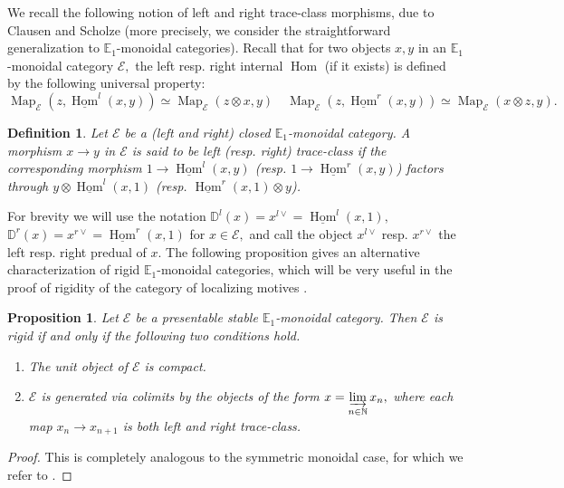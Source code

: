 \documentclass[11pt,leqno]{amsart}
\newtheorem{defi}[theo]{Definition}
\newtheorem{prop}[theo]{Proposition}
\numberwithin{equation}{section}
\def\N{\mathbb{N}}
\def\Hom{\operatorname{Hom}}
\def\Map{\operatorname{Map}}
\newcommand{\indlim}[1][]{\mathop{\varinjlim}\limits_{#1}}
\newcommand{\bbD}{{\mathbb D}}
\newcommand{\bE}{{\mathbb E}}
\newcommand{\cE}{{\mathcal E}}
\newcommand{\un}{\underline}
\begin{document}
We recall the following notion of left and right trace-class morphisms, due to Clausen and Scholze \cite[Definition 13.11]{CS20} (more precisely, we consider the straightforward generalization to $\bE_1$-monoidal categories). Recall that for two objects $x,y$ in an $\bE_1$-monoidal category $\cE,$ the left resp. right internal $\Hom$ (if it exists) is defined by the following universal property:
\begin{equation*}
\Map_{\cE}(z,\un{\Hom}^l(x,y))\simeq \Map_{\cE}(z\otimes x,y)\quad \Map_{\cE}(z,\un{\Hom}^r(x,y))\simeq \Map_{\cE}(x\otimes z,y).
\end{equation*}

\begin{defi}\label{def:trace_class} Let $\cE$ be a (left and right) closed $\bE_1$-monoidal category. A morphism $x\to y$ in $\cE$ is said to be left (resp. right) trace-class if the corresponding morphism $1\to\un{\Hom}^l(x,y)$ (resp. $1\to\un{\Hom}^r(x,y)$) factors through $y\otimes \un{\Hom}^l(x,1)$ (resp. $\un{\Hom}^r(x,1)\otimes y$).
\end{defi}

For brevity we will use the notation $\bbD^l(x)=x^{l\vee}=\un{\Hom}^l(x,1),$ $\bbD^r(x)=x^{r\vee}=\un{\Hom}^r(x,1)$ for $x\in\cE,$ and call the object $x^{l\vee}$ resp. $x^{r\vee}$ the left resp. right predual of $x.$ The following proposition gives an alternative characterization of rigid $\bE_1$-monoidal categories, which will be very useful in the proof of rigidity of the category of localizing motives \cite{E}.

\begin{prop}\label{prop:rigidity_criterion}\cite{Ram24b}
Let $\cE$ be a presentable stable $\bE_1$-monoidal category. Then $\cE$ is rigid if and only if the following two conditions hold.
\begin{enumerate}[label=(\roman*), ref=(\roman*)]
\item The unit object of $\cE$ is compact.
\item $\cE$ is generated via colimits by the objects of the form $x=\indlim[n\in\N]x_n,$ where each map $x_n\to x_{n+1}$ is both left and right trace-class. 
\end{enumerate} 
\end{prop}

\begin{proof}
This is completely analogous to the symmetric monoidal case, for which we refer to \cite[Corollary 4.57]{Ram24b}.
\end{proof}
\end{document}

